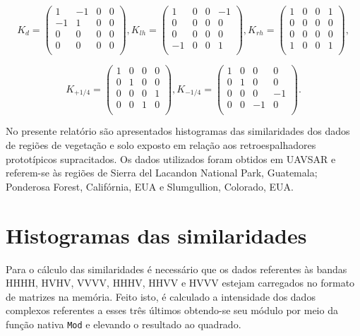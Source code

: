 \documentclass[12pt]{article}
\begin{document}
\[K_d=
\begin{pmatrix}
1 & -1 & 0 & 0\\
-1 & 1 & 0 & 0\\
0 & 0 & 0 & 0\\
0 & 0 & 0 & 0\\
\end{pmatrix},
K_{lh}=
\begin{pmatrix}
1 & 0 & 0 & -1\\
0 & 0 & 0 & 0\\
0 & 0 & 0 & 0\\
-1 & 0 & 0 & 1\\
\end{pmatrix},
K_{rh}=
\begin{pmatrix}
1 & 0 & 0 & 1\\
0 & 0 & 0 & 0\\
0 & 0 & 0 & 0\\
1 & 0 & 0 & 1\\
\end{pmatrix}
,\]

\[K_{+1/4}=
\begin{pmatrix}
1 & 0 & 0 & 0\\
0 & 1 & 0 & 0\\
0 & 0 & 0 & 1\\
0 & 0 & 1 & 0\\
\end{pmatrix},
K_{-1/4}=
\begin{pmatrix}
1 & 0 & 0 & 0\\
0 & 1 & 0 & 0\\
0 & 0 & 0 & -1\\
0 & 0 & -1 & 0\\
\end{pmatrix}
.\]

No presente relatório são apresentados histogramas das similaridades dos dados de regiões de vegetação e solo exposto em relação aos retroespalhadores prototípicos supracitados. Os dados utilizados foram obtidos em UAVSAR e referem-se às regiões de Sierra del Lacandon National Park, Guatemala; Ponderosa Forest, Califórnia, EUA e Slumgullion, Colorado, EUA.

\section{Histogramas das similaridades}

Para o cálculo das similaridades é necessário que os dados referentes às bandas HHHH, HVHV, VVVV, HHHV, HHVV e HVVV estejam carregados no formato de matrizes na memória. Feito isto, é calculado a intensidade dos dados complexos referentes a esses três últimos obtendo-se seu módulo por meio da função nativa \texttt{Mod} e elevando o resultado ao quadrado. 
\end{document}
